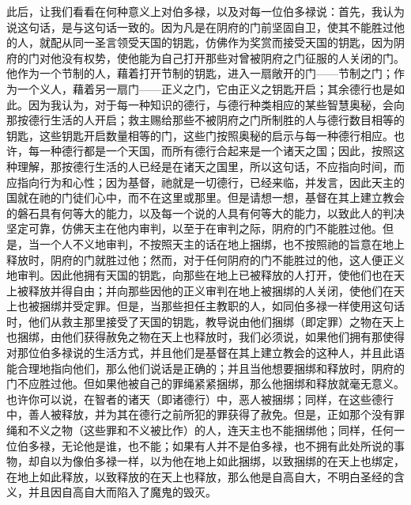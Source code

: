 此后，让我们看看在何种意义上对伯多禄，以及对每一位伯多禄说：首先，我认为说这句话，是与这句话一致的。因为凡是在阴府的门前坚固自卫，使其不能胜过他的人，就配从同一圣言领受天国的钥匙，仿佛作为奖赏而接受天国的钥匙，因为阴府的门对他没有权势，使他能为自己打开那些对曾被阴府之门征服的人关闭的门。他作为一个节制的人，藉着打开节制的钥匙，进入一扇敞开的门——节制之门；作为一个义人，藉着另一扇门——正义之门，它由正义之钥匙开启；其余德行也是如此。因为我认为，对于每一种知识的德行，与德行种类相应的某些智慧奥秘，会向那按德行生活的人开启；救主赐给那些不被阴府之门所制胜的人与德行数目相等的钥匙，这些钥匙开启数量相等的门，这些门按照奥秘的启示与每一种德行相应。也许，每一种德行都是一个天国，而所有德行合起来是一个诸天之国；因此，按照这种理解，那按德行生活的人已经是在诸天之国里，所以这句话，不应指向时间，而应指向行为和心性；因为基督，祂就是一切德行，已经来临，并发言，因此天主的国就在祂的门徒们心中，而不在这里或那里。但是请想一想，基督在其上建立教会的磐石具有何等大的能力，以及每一个说的人具有何等大的能力，以致此人的判决坚定可靠，仿佛天主在他内审判，以至于在审判之际，阴府的门不能胜过他。但是，当一个人不义地审判，不按照天主的话在地上捆绑，也不按照祂的旨意在地上释放时，阴府的门就胜过他；然而，对于任何阴府的门不能胜过的他，这人便正义地审判。因此他拥有天国的钥匙，向那些在地上已被释放的人打开，使他们也在天上被释放并得自由；并向那些因他的正义审判在地上被捆绑的人关闭，使他们在天上也被捆绑并受定罪。但是，当那些担任主教职的人，如同伯多禄一样使用这句话时，他们从救主那里接受了天国的钥匙，教导说由他们捆绑（即定罪）之物在天上也捆绑，由他们获得赦免之物在天上也释放时，我们必须说，如果他们拥有那使得对那位伯多禄说的生活方式，并且他们是基督在其上建立教会的这种人，并且此语能合理地指向他们，那么他们说话是正确的；并且当他想要捆绑和释放时，阴府的门不应胜过他。但如果他被自己的罪绳紧紧捆绑，那么他捆绑和释放就毫无意义。也许你可以说，在智者的诸天（即诸德行）中，恶人被捆绑；同样，在这些德行中，善人被释放，并为其在德行之前所犯的罪获得了赦免。但是，正如那个没有罪绳和不义之物（这些罪和不义被比作）的人，连天主也不能捆绑他；同样，任何一位伯多禄，无论他是谁，也不能；如果有人并不是伯多禄，也不拥有此处所说的事物，却自以为像伯多禄一样，以为他在地上如此捆绑，以致捆绑的在天上也绑定，在地上如此释放，以致释放的在天上也释放，那么他是自高自大，不明白圣经的含义，并且因自高自大而陷入了魔鬼的毁灭。\par

